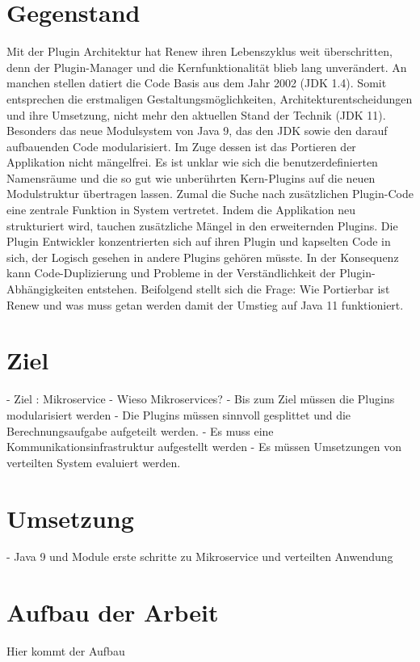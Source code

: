 \section{Gegenstand}
Mit der Plugin Architektur hat Renew ihren Lebenszyklus weit überschritten, denn der Plugin-Manager und die Kernfunktionalität blieb lang unverändert. An manchen stellen datiert die Code Basis aus dem Jahr 2002 (JDK 1.4). 
Somit entsprechen die erstmaligen Gestaltungsmöglichkeiten, Architekturentscheidungen und ihre Umsetzung, nicht mehr den aktuellen Stand der Technik (JDK 11). Besonders das neue Modulsystem von Java 9, das den JDK sowie den darauf aufbauenden Code modularisiert. 
Im Zuge dessen ist das Portieren der Applikation nicht mängelfrei. Es ist unklar wie sich die benutzerdefinierten Namensräume und die so gut wie unberührten Kern-Plugins auf die neuen Modulstruktur übertragen lassen. Zumal die Suche nach zusätzlichen Plugin-Code eine zentrale Funktion in System vertretet.\bigbreak
Indem die Applikation neu strukturiert wird, tauchen zusätzliche Mängel in den erweiternden Plugins. Die Plugin Entwickler  konzentrierten sich auf ihren Plugin und kapselten Code in sich, der Logisch gesehen in andere Plugins gehören müsste. In der Konsequenz kann Code-Duplizierung und Probleme in der Verständlichkeit der Plugin-Abhängigkeiten entstehen.\newline
Beifolgend stellt sich die Frage: Wie Portierbar ist Renew und was muss getan werden damit der Umstieg auf Java 11 funktioniert. \bigbreak

\section{Ziel}%
- Ziel : Mikroservice
- Wieso Mikroservices? 
- Bis zum Ziel müssen die Plugins modularisiert werden
- Die Plugins müssen sinnvoll gesplittet und die Berechnungsaufgabe aufgeteilt werden.
- Es muss eine Kommunikationsinfrastruktur aufgestellt werden
- Es müssen Umsetzungen von verteilten System evaluiert werden. 

\section{Umsetzung}
- Java 9 und Module erste schritte zu Mikroservice und verteilten Anwendung  

\section{Aufbau der Arbeit}
Hier kommt der Aufbau 

